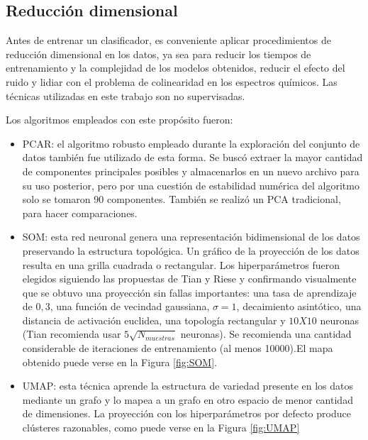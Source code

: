 \documentclass[12pt]{article}
\begin{document}


\subsection{Reducción dimensional}

Antes de entrenar un clasificador, es conveniente aplicar procedimientos de reducción dimensional en los datos, ya sea para reducir los tiempos de entrenamiento y la complejidad de los modelos obtenidos, reducir el efecto del ruido y lidiar con el problema de colinearidad en los espectros químicos. Las técnicas utilizadas en este trabajo son no supervisadas.

Los algoritmos empleados con este propósito fueron:

\begin{itemize}
  \item PCAR: el algoritmo robusto empleado durante la exploración del conjunto de datos también fue utilizado de esta forma. Se buscó extraer la mayor cantidad de componentes principales posibles y almacenarlos en un nuevo archivo para su uso posterior, pero por una cuestión de estabilidad numérica del algoritmo solo se tomaron 90 componentes. También se realizó un PCA tradicional, para hacer comparaciones.
  \item SOM: esta red neuronal genera una representación bidimensional de los datos preservando la estructura topológica. Un gráfico de la proyección de los datos resulta en una grilla cuadrada o rectangular. Los hiperparámetros fueron elegidos siguiendo las propuestas de Tian\cite{Tian2014} y Riese\cite{SuSi} y confirmando visualmente que se obtuvo una proyección sin fallas importantes: una tasa de aprendizaje de $0,3$, una función de vecindad gaussiana, $\sigma = 1$, decaimiento asintótico, una distancia de activación euclidea, una topología rectangular y $10X10$ neuronas (Tian recomienda usar $5 \sqrt{N_{muestras}}$ neuronas). Se recomienda una cantidad considerable de iteraciones de entrenamiento (al menos 10000).El mapa obtenido puede verse en la Figura \ref{fig:SOM}.
  \item UMAP: esta técnica aprende la estructura de variedad presente en los datos mediante un grafo y lo mapea a un grafo en otro espacio de menor cantidad de dimensiones. La proyección con los hiperparámetros por defecto produce clústeres razonables, como puede verse en la Figura \ref{fig:UMAP}
\end{itemize}
\end{document}
